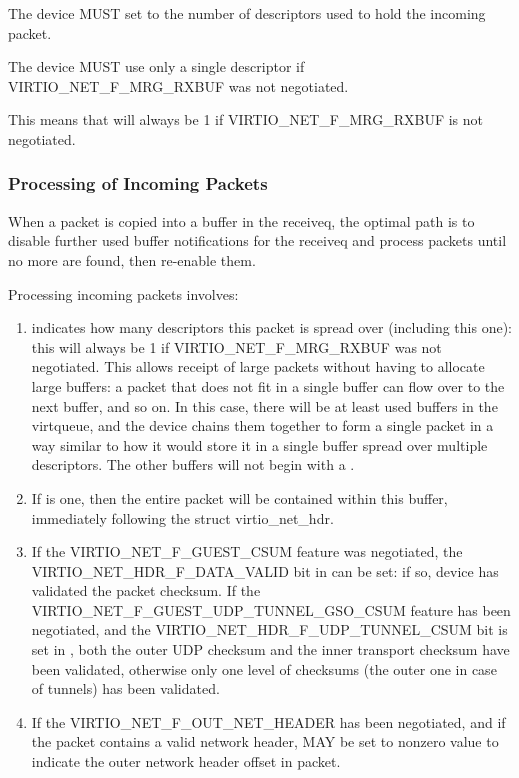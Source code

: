 The device MUST set  to the number of descriptors used to
hold the incoming packet.

The device MUST use only a single descriptor if VIRTIO_NET_F_MRG_RXBUF
was not negotiated.
\begin{note}
{This means that  will always be 1
if VIRTIO_NET_F_MRG_RXBUF is not negotiated.}
\end{note}

\subsubsection{Processing of Incoming Packets}\label{sec:Device Types / Network Device / Device Operation / Processing of Incoming Packets}
\label{sec:Device Types / Network Device / Device Operation / Processing of Packets}%

When a packet is copied into a buffer in the receiveq, the
optimal path is to disable further used buffer notifications for the
receiveq and process packets until no more are found, then re-enable
them.

Processing incoming packets involves:

\begin{enumerate}
\item {} indicates how many descriptors
  this packet is spread over (including this one): this will
  always be 1 if VIRTIO_NET_F_MRG_RXBUF was not negotiated.
  This allows receipt of large packets without having to allocate large
  buffers: a packet that does not fit in a single buffer can flow
  over to the next buffer, and so on. In this case, there will be
  at least  used buffers in the virtqueue, and the device
  chains them together to form a single packet in a way similar to
  how it would store it in a single buffer spread over multiple
  descriptors.
  The other buffers will not begin with a .

\item If
   is one, then the entire packet will be
  contained within this buffer, immediately following the struct
  virtio_net_hdr.
\item If the VIRTIO_NET_F_GUEST_CSUM feature was negotiated, the
  VIRTIO_NET_HDR_F_DATA_VALID bit in  can be
  set: if so, device has validated the packet checksum.
  If the VIRTIO_NET_F_GUEST_UDP_TUNNEL_GSO_CSUM feature has been negotiated,
  and the VIRTIO_NET_HDR_F_UDP_TUNNEL_CSUM bit is set in ,
  both the outer UDP checksum and the inner transport checksum
  have been validated, otherwise only one level of checksums (the outer one
  in case of tunnels) has been validated.
\item If the VIRTIO_NET_F_OUT_NET_HEADER has been negotiated, and if the packet
  contains a valid network header,  MAY be set to nonzero
  value to indicate the outer network header offset in packet.
\end{enumerate}

